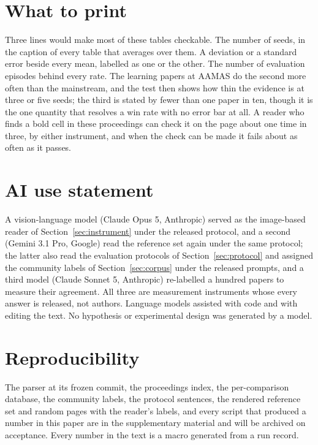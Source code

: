\documentclass[sigconf,anonymous]{aamas}
\begin{document}
\section{What to print}
\label{sec:conclusion}

Three lines would make most of these tables checkable. The number of seeds,
in the caption of every table that averages over them. A deviation or a
standard error beside every mean, labelled as one or the other. The number of
evaluation episodes behind every rate. The learning papers at AAMAS do the
second more often than the mainstream, and the test then shows how thin the
evidence is at three or five seeds; the third is stated by fewer than one
paper in ten, though it is the one quantity that resolves a win rate with no
error bar at all. A reader who finds a bold cell in these proceedings can check it on the
page about one time in three, by either instrument, and when the check can
be made it fails about as often as it passes.

\section*{AI use statement}
A vision-language model (Claude Opus 5, Anthropic) served as the image-based
reader of Section~\ref{sec:instrument} under the released protocol, and a
second (Gemini 3.1 Pro, Google) read the reference set again under the same
protocol; the latter also read the evaluation protocols of
Section~\ref{sec:protocol} and assigned the community labels of
Section~\ref{sec:corpus} under the released prompts, and a third model
(Claude Sonnet 5, Anthropic) re-labelled a hundred papers to measure their
agreement. All three are measurement instruments whose every answer is
released, not authors. Language models assisted with code and with editing
the text. No hypothesis or experimental design was generated by a model.

\section*{Reproducibility}
The parser at its frozen commit, the proceedings index, the per-comparison
database, the community labels, the protocol sentences, the rendered
reference set and random pages with the reader's labels, and every script
that produced a number in this paper are in the supplementary material and
will be archived on acceptance. Every number in the text is a macro generated
from a run record.

\balance


\end{document}
